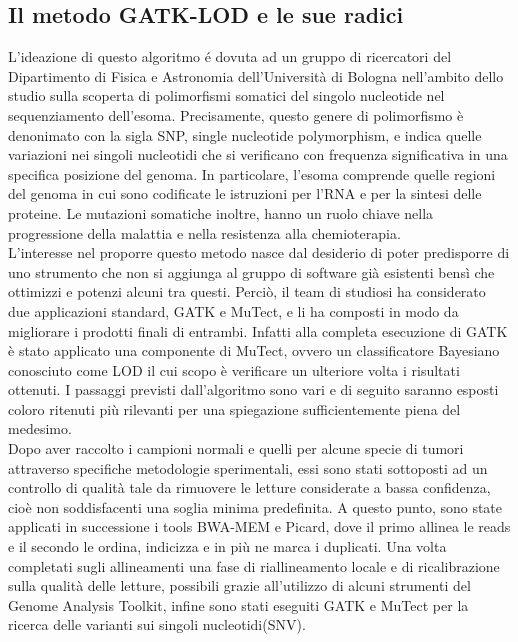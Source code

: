 \subsection{Il metodo GATK-LOD e le sue radici}
L'ideazione di questo algoritmo é dovuta ad un gruppo di ricercatori del Dipartimento di Fisica e Astronomia dell'Università di Bologna nell'ambito dello studio sulla scoperta di polimorfismi somatici del singolo nucleotide nel sequenziamento dell'esoma. Precisamente, questo genere di polimorfismo è denonimato con la sigla SNP, single nucleotide polymorphism, e indica quelle variazioni nei singoli nucleotidi che si verificano con frequenza significativa in una specifica posizione del genoma. In particolare, l'esoma comprende quelle regioni del genoma in cui sono codificate le istruzioni per l'RNA e per la sintesi delle proteine. Le mutazioni somatiche inoltre, hanno un ruolo chiave nella progressione della malattia e nella resistenza alla chemioterapia.  \\
L'interesse nel proporre questo metodo nasce dal desiderio di poter predisporre di uno strumento che non si aggiunga al gruppo di software già esistenti bensì che ottimizzi e potenzi alcuni tra questi. Perciò, il team di studiosi ha considerato due applicazioni standard, GATK e MuTect, e li ha composti in modo da migliorare i prodotti finali di entrambi. Infatti alla completa esecuzione di GATK è stato applicato una componente di MuTect, ovvero un classificatore Bayesiano conosciuto come LOD il cui scopo è verificare un ulteriore volta i risultati ottenuti. I passaggi previsti dall'algoritmo sono vari e di seguito saranno esposti coloro ritenuti più rilevanti per una spiegazione sufficientemente piena del medesimo.\\
Dopo aver raccolto i campioni normali e quelli per alcune specie di tumori attraverso specifiche metodologie sperimentali, essi sono stati sottoposti ad un controllo di qualità tale da rimuovere le letture considerate a bassa confidenza, cioè non soddisfacenti una soglia minima predefinita. A questo punto, sono state applicati in successione i tools BWA-MEM e Picard, dove il primo allinea le reads e il secondo le ordina, indicizza e in più ne marca i duplicati. Una volta completati sugli allineamenti una fase di riallineamento locale e di ricalibrazione sulla qualità delle letture, possibili grazie all'utilizzo di alcuni strumenti del Genome Analysis Toolkit, infine sono stati eseguiti GATK e MuTect per la ricerca delle varianti sui singoli nucleotidi(SNV).\\
